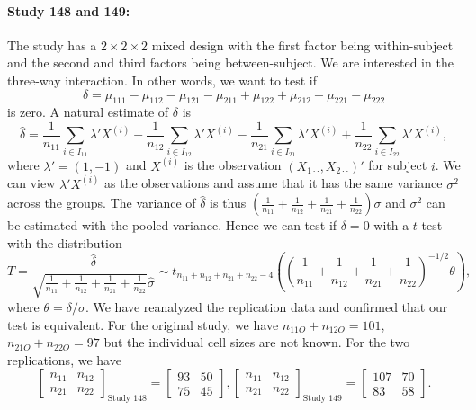\documentclass[11pt]{article}
\theoremstyle{definition}
\theoremstyle{custom}
\newcommand{\hdelta}{\hat{\delta}}
\newcommand{\hsigma}{\hat{\sigma}}
\begin{document}
  \paragraph{Study 148 and 149: \citet{Bressan:2008cj}}
  The study has a $2 \times 2 \times 2$ mixed design with the first factor being within-subject and the second and third factors being between-subject. We are interested in the three-way interaction. In other words, we want to test if
  \[
  \delta = \mu_{111} - \mu_{112} - \mu_{121} - \mu_{211} + \mu_{122} + \mu_{212} + \mu_{221} - \mu_{222}
  \]
  is zero. A natural estimate of $\delta$ is
  \[
  \hdelta = \frac{1}{n_{11}} \sum_{i \in I_{11}} \lambda' X^{(i)} - \frac{1}{n_{12}} \sum_{i \in I_{12}} \lambda' X^{(i)} - \frac{1}{n_{21}} \sum_{i \in I_{21}} \lambda' X^{(i)} + \frac{1}{n_{22}} \sum_{i \in I_{22}} \lambda' X^{(i)},
  \]
  where $\lambda' = (1, -1)$ and $X^{(i)}$ is the observation $(X_{1 \cdot \cdot}, X_{2 \cdot \cdot})'$ for subject $i$. We can view $\lambda' X^{(i)}$ as the observations and assume that it has the same variance $\sigma^2$ across the groups. The variance of $\hdelta$ is thus $(\frac{1}{n_{11}} + \frac{1}{n_{12}} + \frac{1}{n_{21}} + \frac{1}{n_{22}}) \sigma$ and $\sigma^2$ can be estimated with the pooled variance. Hence we can test if $\delta = 0$ with a $t$-test with the distribution
  \[
  T = \frac{\hdelta}{\sqrt{\frac{1}{n_{11}} + \frac{1}{n_{12}} + \frac{1}{n_{21}} + \frac{1}{n_{22}}} \hsigma} \sim t_{n_{11} + n_{12} + n_{21} + n_{22} - 4}\left(\left(\frac{1}{n_{11}} + \frac{1}{n_{12}} + \frac{1}{n_{21}} + \frac{1}{n_{22}}\right)^{-1/2} \theta\right),
  \]
  where $\theta = \delta / \sigma$. We have reanalyzed the replication data and confirmed that our test is equivalent. For the original study, we have $n_{11O} + n_{12O} = 101$, $n_{21O} + n_{22O} = 97$ but the individual cell sizes are not known. For the two replications, we have
  \[
  \begin{bmatrix}
  n_{11} & n_{12} \\
  n_{21} & n_{22}
  \end{bmatrix}_{\text{Study 148}} = \begin{bmatrix}
  93 & 50 \\
  75 & 45
  \end{bmatrix}, \begin{bmatrix}
  n_{11} & n_{12} \\
  n_{21} & n_{22}
  \end{bmatrix}_{\text{Study 149}} = \begin{bmatrix}
  107 & 70 \\
  83 & 58
  \end{bmatrix}.
  \]
\end{document}
